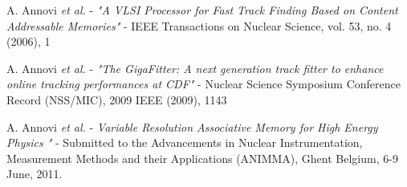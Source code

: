 \documentclass[10pt,a4paper]{article}
\begin{document}
\begin{thebibliography}{99}

 A. Annovi {\it et al.} - {\it "A VLSI Processor for Fast Track Finding Based on Content Addressable Memories"} - IEEE Transactions on Nuclear Science, vol. 53, no. 4 (2006), 1

 A. Annovi {\it et al.} - {\it "The GigaFitter: A next generation track fitter to enhance online tracking performances at CDF"} - Nuclear Science Symposium Conference Record (NSS/MIC), 2009 IEEE (2009), 1143


 A. Annovi {\it et al.}  - {\it Variable Resolution Associative Memory for High Energy Physics
"} - Submitted to the Advancements in Nuclear Instrumentation, Measurement Methods and their Applications (ANIMMA), Ghent Belgium, 6-9 June, 2011.



\end{thebibliography}


\end{document}
